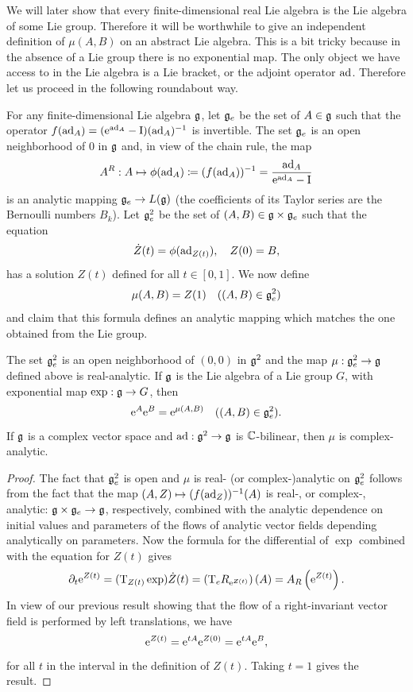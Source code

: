We will later show that every finite-dimensional real Lie algebra is the Lie algebra of some Lie group. Therefore it will be worthwhile to give an independent definition of $\mu(A,B)$ on an abstract Lie algebra. This is a bit tricky because in the absence of a Lie group there is no exponential map. The only object we have access to in the Lie algebra is a Lie bracket, or the adjoint operator $\mathrm{ad}$. Therefore let us proceed in the following roundabout way.

For any finite-dimensional Lie algebra $\mathfrak{g}$, let $\mathfrak{g}_e$ be the set of $A\in \mathfrak{g}$ such that the operator $f(\mathrm{ad}_A)=(\mathrm{e}^{\mathrm{ad}_A}-\mathrm{I})(\mathrm{ad}_A)^{-1}$ is invertible. The set $\mathfrak{g}_e$ is an open neighborhood of $0$ in $\mathfrak{g}$ and, in view of the chain rule, the map
\[A^R:A\mapsto \phi(\mathrm{ad}_A)\coloneqq (f(\mathrm{ad}_A))^{-1}=\frac{\mathrm{ad}_A}{\mathrm{e}^{\mathrm{ad}_A}-\mathrm{I}}\label{eq 1.6.1 DK}\]
is an analytic mapping $\mathfrak{g}_e\to \boldsymbol{\mathrm{\mathrm}}{L}(\mathfrak{g})$ (the coefficients of its Taylor series are the Bernoulli numbers $B_k$). Let $\mathfrak{g}_e^2$ be the set of $(A,B)\in \mathfrak{g}\times\mathfrak{g}_e$ such that the equation
\[\dot Z(t)=\phi(\mathrm{ad}_{Z(t)}),\quad Z(0)=B,\label{eq Z(t)}\]
has a solution $Z(t)$ defined for all $t\in [0,1]$. We now define
\[\mu(A,B)=Z(1)\quad ((A,B)\in\mathfrak{g}_e^2) \label{def local mu}\]
and claim that this formula defines an analytic mapping which matches the one obtained from the Lie group.


\begin{thm}[{{\cite[Thm.~1.6.1]{DK}}}]
    The set $\mathfrak{g}_e^2$ is an open neighborhood of $(0,0)$ in $\mathfrak{g}^2$ and the map $\mu:\mathfrak{g}_e^2\to \mathfrak{g}$ defined above is real-analytic. If $\mathfrak{g}$ is the Lie algebra of a Lie group $G$, with exponential map $\exp:\mathfrak{g}\to G$, then
    \[\mathrm{e}^A \mathrm{e}^B=\mathrm{e}^{\mu(A,B)}\quad ((A,B)\in\mathfrak{g}_e^2).\label{eq 1.6.4 DK}\]
    If $\mathfrak{g}$ is a complex vector space and $\mathrm{ad}:\mathfrak{g}^2\to \mathfrak{g}$ is $\mathbb{C}$-bilinear, then $\mu$ is complex-analytic.
\end{thm}
\begin{proof}
    The fact that $\mathfrak{g}_e^2$ is open and $\mu$ is real- (or complex-)analytic on $\mathfrak{g}_e^2$ follows from the fact that the map $(A,Z)\mapsto (f(\mathrm{ad}_Z))^{-1}(A)$ is real-, or complex-, analytic: $\mathfrak{g}\times\mathfrak{g}_e\to \mathfrak{g}$, respectively, combined with the analytic dependence on initial values and parameters of the flows of analytic vector fields depending analytically on parameters. Now the formula for the differential of $\exp$ combined with the equation for $Z(t)$ gives
    \[\partial_t \mathrm{e}^{Z(t)}=(\mathrm{T}_{Z(t)}\exp )\dot Z(t)=\left(\mathrm{T}_e R_{\mathrm{e}^{Z(t)}}\right)(A)=A_R\left(\mathrm{e}^{Z(t)}\right).\label{eq 1.6.5 DK}\]
    In view of our previous result showing that the flow of a right-invariant vector field is performed by left translations, we have
    \[\mathrm{e}^{Z(t)}=\mathrm{e}^{tA}\mathrm{e}^{Z(0)}=\mathrm{e}^{tA}\mathrm{e}^B,\label{8284}\]
    for all $t$ in the interval in the definition of $Z(t)$. Taking $t=1$ gives the result.
\end{proof}


